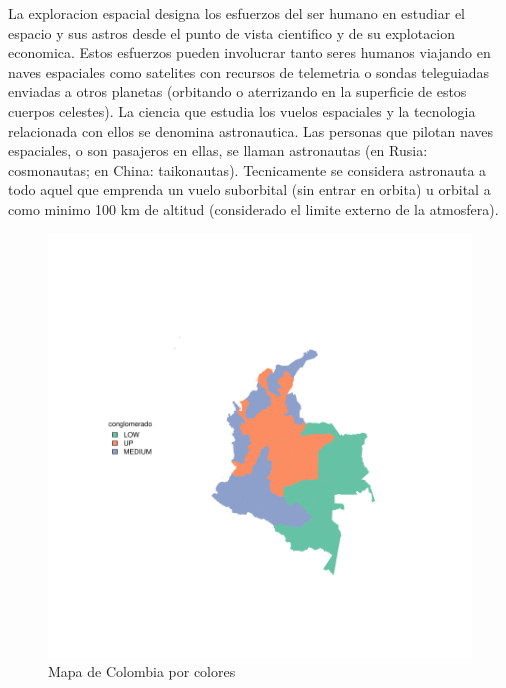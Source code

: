 \documentclass{article}
\begin{document}
La exploracion espacial designa los esfuerzos del ser humano en estudiar el espacio y sus astros desde el punto de vista cientifico y de su explotacion economica. Estos esfuerzos pueden involucrar tanto seres humanos viajando en naves espaciales como satelites con recursos de telemetria o sondas teleguiadas enviadas a otros planetas (orbitando o aterrizando en la superficie de estos cuerpos celestes). La ciencia que estudia los vuelos espaciales y la tecnologia relacionada con ellos se denomina astronautica. Las personas que pilotan naves espaciales, o son pasajeros en ellas, se llaman astronautas (en Rusia: cosmonautas; en China: taikonautas). Tecnicamente se considera astronauta a todo aquel que emprenda un vuelo suborbital (sin entrar en orbita) u orbital a como minimo 100 km de altitud (considerado el limite externo de la atmosfera).

\begin{figure}[h]



\includegraphics{ProyectoIntegrador-plotMap1}
\caption{Mapa de Colombia por colores}
\end{figure}

\clearpage


\renewcommand{\refname}{Bibliografia}

\end{document}
